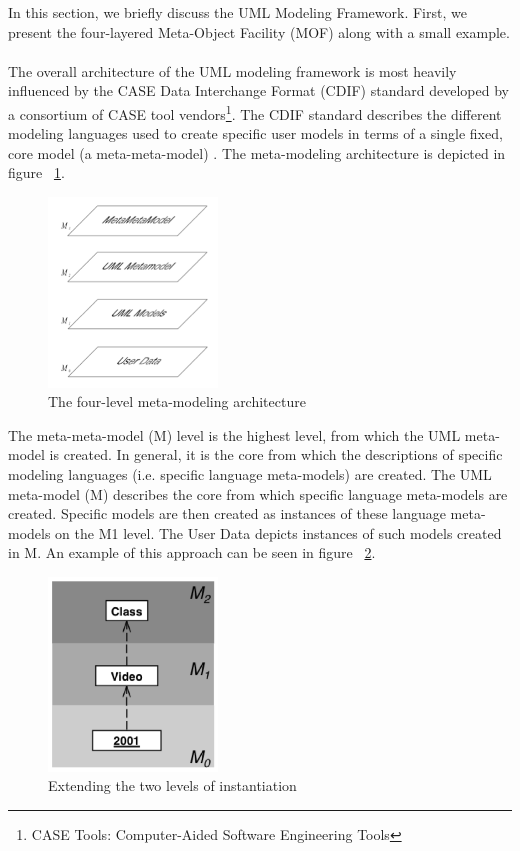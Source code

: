 In this section, we briefly discuss the UML Modeling Framework. First, we present the four-layered Meta-Object Facility (MOF) along with a small example. \\ \\
The overall architecture of the UML modeling framework is most heavily influenced by the CASE Data Interchange Format (CDIF) standard developed by a consortium of CASE tool vendors\footnote{CASE Tools: Computer-Aided Software Engineering Tools}. The CDIF standard describes the different modeling languages used to create specific user models in terms of a single fixed, core model (a meta-meta-model) \cite{RearchitectingUML}. The meta-modeling architecture is depicted in figure ~\ref{fig:mm_architecture}.
\begin{figure}[h!]
\centering
\includegraphics[width=0.4\textwidth]{images/mm_architecture.png}
\caption{The four-level meta-modeling architecture}
\label{fig:mm_architecture}
\end{figure}
The meta-meta-model (M) level is the highest level, from which the UML meta-model is created. In general, it is the core from which the descriptions of specific modeling languages (i.e. specific language meta-models) are created. The UML meta-model (M) describes the core from which specific language meta-models are created. Specific models are then created as instances of these language meta-models on the M1 level. The User Data depicts instances of such models created in M. An example of this approach can be seen in figure ~\ref{fig:two_level_inst}.
\begin{figure}[h!]
\centering
\includegraphics[width=0.4\textwidth]{images/chap2_two_level_inst.png}
\caption{Extending the two levels of instantiation}
\label{fig:two_level_inst}
\end{figure}
